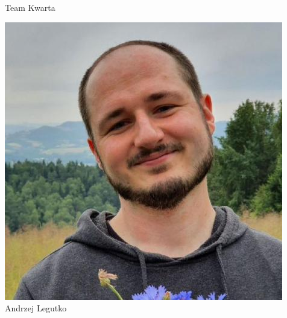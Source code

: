 \begin{frame}[t]{Team Kwarta}
\begin{minipage}{0.22\linewidth}
\includegraphics[width=\linewidth]{img/AL}\\
\scriptsize Andrzej Legutko \\
\scriptsize {}
\end{minipage}
\end{frame}
